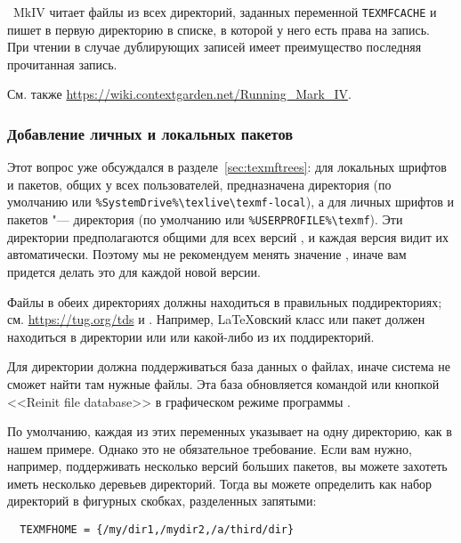 \documentclass{article}
\begin{document}
\ConTeXt\ MkIV читает файлы из всех директорий, заданных
переменной \verb+TEXMFCACHE+ и пишет в первую директорию в списке, в
которой у него есть права на запись.  При чтении в случае дублирующих
записей имеет преимущество последняя прочитанная запись.

См. также
\url{https://wiki.contextgarden.net/Running_Mark_IV}.


\subsubsection{Добавление личных и локальных пакетов}
\label{sec:local-personal-macros}

Этот вопрос уже обсуждался в разделе~\ref{sec:texmftrees}: для
локальных шрифтов и пакетов, общих у всех пользователей, 
предназначена директория
 (по умолчанию
 или
\verb|%SystemDrive%\texlive\texmf-local|), а для личных шрифтов и
пакетов "--- директория  (по умолчанию
 или \verb|%USERPROFILE%\texmf|).  Эти директории   %
предполагаются общими для всех версий \TL{}, и каждая версия \TL{}
видит их автоматически.  Поэтому мы не рекомендуем менять значение
, иначе вам придется делать это для каждой новой
версии.

Файлы в обеих директориях должны находиться в правильных
поддиректориях; см. \url{https://tug.org/tds} и
.  Например, \LaTeX овский класс или
пакет должен находиться в директории   или
 или какой-либо из их поддиректорий.

Для директории  должна поддерживаться база данных
о файлах, иначе система не сможет найти там нужные файлы.  Эта база
обновляется командой  или кнопкой <<Reinit file
database>> в графическом режиме программы .

По умолчанию, каждая из этих переменных указывает на одну директорию,
как в нашем примере.  Однако это не обязательное требование.  Если вам
нужно, например, поддерживать несколько версий больших пакетов, вы
можете захотеть иметь несколько деревьев директорий.  Тогда вы можете
определить  как набор директорий в фигурных
скобках, разделенных запятыми:

\begin{verbatim}
  TEXMFHOME = {/my/dir1,/mydir2,/a/third/dir}
\end{verbatim}
\end{document}
